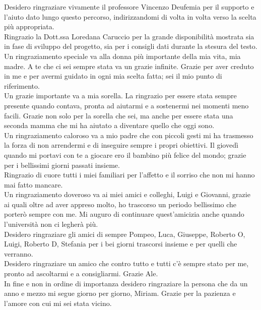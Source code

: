 Desidero ringraziare vivamente il professore Vincenzo Deufemia per il supporto e l'aiuto dato lungo questo percorso, indirizzandomi di volta in volta verso la scelta più appropriata.\\
Ringrazio la Dott.ssa Loredana Caruccio per la grande disponibilità mostrata sia in fase di sviluppo del progetto, sia per i consigli dati durante la stesura del testo.\\
Un ringraziamento speciale va alla donna più importante della mia vita, mia madre. A te che ci sei sempre stata va un grazie infinite. Grazie per aver creduto in me e per avermi guidato in ogni mia scelta fatta; sei il mio punto di riferimento.\\
Un grazie importante va a mia sorella. La ringrazio per essere stata sempre presente quando contava, pronta ad aiutarmi e a sostenermi nei momenti meno facili. Grazie non solo per la sorella che sei, ma anche per essere stata una seconda mamma che mi ha aiutato a diventare quello che oggi sono.\\
Un ringraziamento caloroso va a mio padre che con piccoli gesti mi ha trasmesso la forza di non arrendermi e di inseguire sempre i propri obiettivi. Il giovedì quando mi portavi con te a giocare ero il bambino più felice del mondo; grazie per i bellissimi giorni passati insieme.\\
Ringrazio di cuore tutti i miei familiari per l'affetto e il sorriso che non mi hanno mai fatto mancare.\\
Un ringraziamento doveroso va ai miei amici e colleghi, Luigi e Giovanni, grazie ai quali oltre ad aver appreso molto, ho trascorso un periodo bellissimo che porterò sempre con me. Mi auguro di continuare quest'amicizia anche quando l'università non ci legherà più.\\
Desidero ringraziare gli amici di sempre Pompeo, Luca, Giuseppe, Roberto O, Luigi, Roberto D, Stefania per i bei giorni trascorsi insieme e per quelli che verranno.\\
Desidero ringraziare un amico che contro tutto e tutti c'è sempre stato per me, pronto ad ascoltarmi e a consigliarmi. Grazie Ale.\\
In fine e non in ordine di importanza desidero ringraziare la persona che da un anno e mezzo mi segue giorno per giorno, Miriam. Grazie per la pazienza e l'amore con cui mi sei stata vicino.